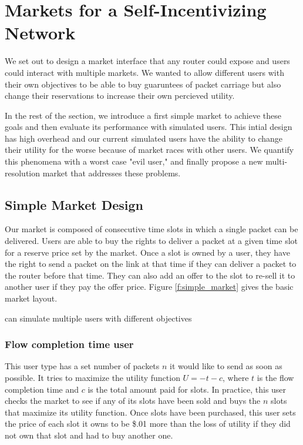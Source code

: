 \section{Markets for a Self-Incentivizing Network}
\label{sec:designs}
We set out to design a market interface that any router could expose and users could interact with multiple markets.
We wanted to allow different users with their own objectives to be able to buy guaruntees of packet carriage but also change their reservations to increase their own percieved utility.

In the rest of the section, we introduce a first simple market to achieve these goals and then evaluate its performance with simulated users.
This intial design has high overhead and our current simulated users have the ability to change their utility for the worse because of market races with other users. We quantify this phenomena with a worst case "evil user," and finally propose a new multi-resolution market that addresses these problems.

%
%
%
%

\subsection{Simple Market Design}
Our market is composed of consecutive time slots in which a single packet can be delivered. Users are able to buy the rights to deliver a packet at a given time slot for a reserve price set by the market. Once a slot is owned by a user, they have the right to send a packet on the link at that time if they can deliver a packet to the router before that time. They can also add an offer to the slot to re-sell it to another user if they pay the offer price. Figure \ref{f:simple_market} gives the basic market layout.

can simulate multiple users with different objectives

\subsubsection{Flow completion time user}
This user type has a set number of packets $n$ it would like to send as soon as possible. It tries to maximize the utility function $U= -t - c$, where $t$ is the flow completion time and $c$ is the total amount paid for slots. In practice, this user checks the market to see if any of its slots have been sold and buys the $n$ slots that maximize its utility function. Once slots have been purchased, this user sets the price of each slot it owns to be \$.01 more than the loss of utility if they did not own that slot and had to buy another one.

